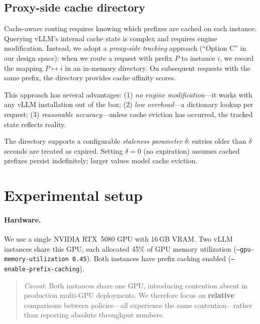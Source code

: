 \documentclass{article}
\begin{document}
\subsection{Proxy-side cache directory}

Cache-aware routing requires knowing which prefixes are cached on each instance. Querying vLLM's internal cache state is complex and requires engine modification. Instead, we adopt a \emph{proxy-side tracking} approach (``Option C'' in our design space): when we route a request with prefix $P$ to instance $i$, we record the mapping $P \mapsto i$ in an in-memory directory. On subsequent requests with the same prefix, the directory provides cache affinity scores.

This approach has several advantages: (1) \emph{no engine modification}---it works with any vLLM installation out of the box; (2) \emph{low overhead}---a dictionary lookup per request; (3) \emph{reasonable accuracy}---unless cache eviction has occurred, the tracked state reflects reality.

The directory supports a configurable \emph{staleness parameter} $\delta$: entries older than $\delta$ seconds are treated as expired. Setting $\delta = 0$ (no expiration) assumes cached prefixes persist indefinitely; larger values model cache eviction.

\section{Experimental setup}
\label{sec:setup}

\paragraph{Hardware.} We use a single NVIDIA RTX~5080 GPU with 16\,GB VRAM. Two vLLM instances share this GPU, each allocated 45\% of GPU memory utilization (\texttt{--gpu-memory-utilization 0.45}). Both instances have prefix caching enabled (\texttt{--enable-prefix-caching}).

\begin{quote}
\emph{Caveat}: Both instances share one GPU, introducing contention absent in production multi-GPU deployments. We therefore focus on \textbf{relative} comparisons between policies---all experience the same contention---rather than reporting absolute throughput numbers.
\end{quote}
\end{document}
